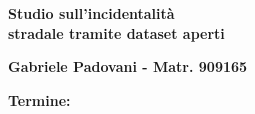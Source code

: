 \documentclass[a4paper,12pt]{article}
\begin{document}
    \begin{center}
    {\huge{\bf Studio sull'incidentalità}}\\
    \vspace{3mm}
    {\huge{\bf stradale tramite dataset aperti}}\\
    \end{center}
    \vspace{3mm}
    \begin{center}
    {\bf Gabriele Padovani - Matr. 909165}\\
    \end{center}
    \vspace{2mm}
    \begin{center}
    {\bf Termine:}\\
    \end{center}




\end{document}
